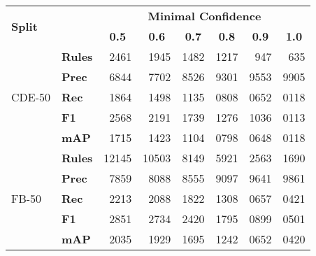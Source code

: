 \begin{tabular}{| l | l | r | r | r | r | r | r |}
    \hline

    \multirow{2}{*}{\textbf{Split}} &
    &
    \multicolumn{6}{|c|}{\textbf{Minimal Confidence}} \\

    &
    &
    \multicolumn{1}{|c|}{\textbf{0.5}} &
    \multicolumn{1}{|c|}{\textbf{0.6}} &
    \multicolumn{1}{|c|}{\textbf{0.7}} &
    \multicolumn{1}{|c|}{\textbf{0.8}} &
    \multicolumn{1}{|c|}{\textbf{0.9}} &
    \multicolumn{1}{|c|}{\textbf{1.0}} \\

    \hline \hline

    \multirow{5}{*}{CDE-50}
    & \textbf{Rules} & \num{2461}  & \num{1945}  & \num{1482} & \num{1217} & \num{947}  & \num{635}  \\
    & \textbf{Prec}  & 6844        & 7702        & 8526       & 9301       & 9553       & 9905       \\
    & \textbf{Rec}   & 1864        & 1498        & 1135       & 0808       & 0652       & 0118       \\
    & \textbf{F1}    & 2568        & 2191        & 1739       & 1276       & 1036       & 0113       \\
    & \textbf{mAP}   & 1715        & 1423        & 1104       & 0798       & 0648       & 0118       \\

    \hline

    \multirow{5}{*}{FB-50}
    & \textbf{Rules} & \num{12145} & \num{10503} & \num{8149} & \num{5921} & \num{2563} & \num{1690} \\
    & \textbf{Prec}  & 7859        & 8088        & 8555       & 9097       & 9641       & 9861       \\
    & \textbf{Rec}   & 2213        & 2088        & 1822       & 1308       & 0657       & 0421       \\
    & \textbf{F1}    & 2851        & 2734        & 2420       & 1795       & 0899       & 0501       \\
    & \textbf{mAP}   & 2035        & 1929        & 1695       & 1242       & 0652       & 0420       \\

    \hline
\end{tabular}
